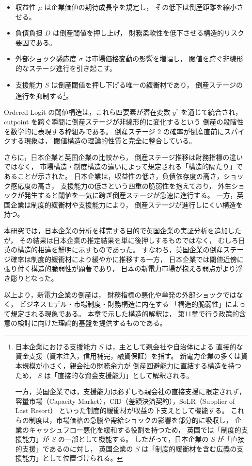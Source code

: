 \begin{itemize}
    \item 収益性 $\mu$ は企業価値の期待成長率を規定し，
          その低下は倒産距離を縮小させる。
    \item 負債負担 $D$ は倒産閾値を押し上げ，
          財務柔軟性を低下させる構造的リスク要因である。
    \item 外部ショック感応度 $\sigma$ は市場価格変動の影響を増幅し，
          閾値を跨ぐ非線形的なステージ進行を引き起こす。
    \item 支援能力 $S$ は倒産閾値を押し下げる唯一の緩衝材であり，
          倒産ステージの進行を抑制する\footnote{
日本企業における支援能力 $S$ は，主として親会社や自治体による
直接的な資金支援（資本注入，信用補完，融資保証）を指す。
新電力企業の多くは資本規模が小さく，親会社の財務余力が
倒産回避能力に直結する構造を持つため，
$S$ は「直接的な資金支援能力」として解釈される。

一方，英国企業では，支援能力は必ずしも親会社の直接支援に限定されず，
容量市場（Capacity Market），CfD（差額決済契約），SoLR（Supplier of Last Resort）
といった制度的緩衝材が収益の下支えとして機能する。
これらの制度は，市場価格の急騰や需給ショックの影響を部分的に吸収し，
企業のキャッシュフロー悪化を緩和する役割を持つため，
英国では「制度的支援能力」が $S$ の一部として機能する。
したがって，日本企業の $S$ が「直接的支援」であるのに対し，
英国企業の $S$ は「制度的緩衝材を含む広義の支援能力」として位置づけられる。}。
\end{itemize}

Ordered Logit の閾値構造は，これら四要素が潜在変数 $y^*$ を通じて統合され，
cutpoint を跨ぐ瞬間に倒産ステージが非線形的に変化するという
倒産の段階性を数学的に表現する枠組みである。
倒産ステージ 2 の確率が倒産直前にスパイクする現象は，
閾値構造の理論的性質と完全に整合している。

さらに，日本企業と英国企業の比較から，
倒産ステージ推移は財務指標の違いではなく，
市場構造・制度構造の違いによって規定される「構造的隔たり」であることが示された。
日本企業は，収益性の低さ，負債依存度の高さ，ショック感応度の高さ，
支援能力の低さという四重の脆弱性を抱えており，
外生ショックが発生すると閾値を一気に跨ぎ倒産ステージが急速に進行する。
一方，英国企業は制度的緩衝材や支援能力により，
倒産ステージが進行しにくい構造を持つ。

本研究では，日本企業の分析を補完する目的で英国企業の実証分析を追加したが，
その結果は日本企業の推定結果を単に後押しするものではなく，
むしろ日英の構造的相違を鮮明に示すものであった。
すなわち，英国企業の倒産ステージ確率は制度的緩衝材により緩やかに推移する一方，
日本企業では閾値近傍に張り付く構造的脆弱性が顕著であり，
日本の新電力市場が抱える弱点がより浮き彫りとなった。

以上より，新電力企業の倒産は，
財務指標の悪化や単発の外部ショックではなく，
ビジネスモデル・市場制度・財務構造に内在する
「構造的脆弱性」によって規定される現象である。
本章で示した構造的解釈は，
第11章で行う政策的含意の検討に向けた理論的基盤を提供するものである。

